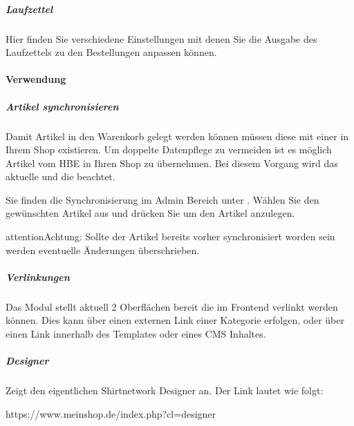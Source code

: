 \documentclass[letterpaper,10pt,ngerman]{sphinxmanual}
\begin{document}
\subparagraph{Laufzettel}
\label{\detokenize{modules/oxid/settings:laufzettel}}
Hier finden Sie verschiedene Einstellungen mit denen Sie die Ausgabe des Laufzettels zu den Bestellungen anpassen können.


\paragraph{Verwendung}
\label{\detokenize{modules/oxid/usage:verwendung}}\label{\detokenize{modules/oxid/usage::doc}}

\subparagraph{Artikel synchronisieren}
\label{\detokenize{modules/oxid/usage:artikel-synchronisieren}}
Damit Artikel in den Warenkorb gelegt werden können müssen diese mit einer {\hyperref[\detokenize{modules/general/skuscheme::doc}]{}} in Ihrem Shop existieren.
Um doppelte Datenpflege zu vermeiden ist es möglich Artikel vom HBE in Ihren Shop zu übernehmen.
Bei diesem Vorgang wird das aktuelle {\hyperref[\detokenize{modules/general/skuscheme::doc}]{}} und die {\hyperref[\detokenize{modules/oxid/settings::doc}]{}} beachtet.

Sie finden die Synchronisierung im Admin Bereich unter . Wählen Sie den gewünschten
Artikel aus und drücken Sie  um den Artikel anzulegen.

\begin{sphinxadmonition}{attention}{Achtung:}
Sollte der Artikel bereits vorher synchronisiert worden sein werden eventuelle Änderungen überschrieben.
\end{sphinxadmonition}


\subparagraph{Verlinkungen}
\label{\detokenize{modules/oxid/usage:verlinkungen}}
Das Modul stellt aktuell 2 Oberflächen bereit die im Frontend verlinkt werden können. Dies kann über einen externen Link
einer Kategorie erfolgen, oder über einen Link innerhalb des Templates oder eines CMS Inhaltes.


\subparagraph{Designer}
\label{\detokenize{modules/oxid/usage:designer}}
Zeigt den eigentlichen Shirtnetwork Designer an. Der Link lautet wie folgt:

\begin{sphinxVerbatim}[commandchars=\\\{\}]
https://www.mein\PYGZhy{}shop.de/index.php?cl=designer
\end{sphinxVerbatim}
\end{document}
